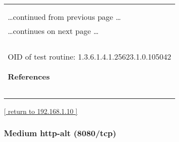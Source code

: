 \documentclass{article}
\begin{document}
\begin{longtable}{|p{}|}
\hline
\rowcolor{openvas_hole}{\color{white}{High (CVSS: 6.8) }}\\
\rowcolor{openvas_hole}{\color{white}{NVT: OpenSSL CCS Man in the Middle Security Bypass Vulnerability}}\\
\hline
\endfirsthead
\hfill\ldots continued from previous page \ldots \\
\hline
\endhead
\hline
\ldots continues on next page \ldots \\
\endfoot
\hline
\endlastfoot
\\
\rowcolor{white}{\verb==}\\
\rowcolor{white}{\verb==}\\
\\
OID of test routine: 1.3.6.1.4.1.25623.1.0.105042\\
\\

      \hline
      \\
\textbf{References}\\
\rowcolor{white}{\verb=CVE: CVE-2014-0224=}\\
\rowcolor{white}{\verb=BID:67899=}\\
\rowcolor{white}{\verb=Other:=}\\
\rowcolor{white}{\verb=  URL:http://www.securityfocus.com/bid/67899=}\\
\rowcolor{white}{\verb=   URL:http://openssl.org/=}\\
\end{longtable}

\begin{footnotesize}\hyperref[host:192.168.1.10]{[ return to 192.168.1.10 ]}\end{footnotesize}
\subsubsection{Medium http-alt (8080/tcp)}
\label{port:192.168.1.10 http-alt (8080/tcp) Medium}
\end{document}
